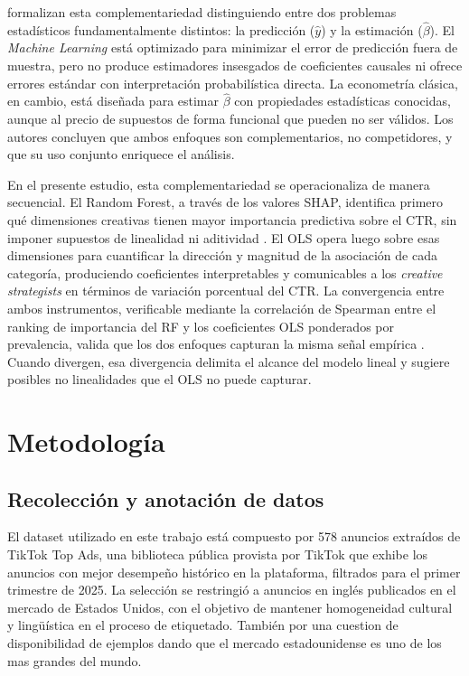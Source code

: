 \documentclass[12pt, a4paper]{report}
\begin{document}
\citet{mullainathan2017} formalizan esta complementariedad distinguiendo entre dos problemas
estadísticos fundamentalmente distintos: la predicción ($\hat{y}$) y la estimación ($\hat{\beta}$).
El \textit{Machine Learning} está optimizado para minimizar el error de predicción fuera de muestra,
pero no produce estimadores insesgados de coeficientes causales ni ofrece errores estándar con
interpretación probabilística directa. La econometría clásica, en cambio, está diseñada para
estimar $\hat{\beta}$ con propiedades estadísticas conocidas, aunque al precio de supuestos de
forma funcional que pueden no ser válidos. Los autores concluyen que ambos enfoques son
complementarios, no competidores, y que su uso conjunto enriquece el análisis.

En el presente estudio, esta complementariedad se operacionaliza de manera secuencial.
El Random Forest, a través de los valores SHAP, identifica primero qué dimensiones
creativas tienen mayor importancia predictiva sobre el CTR, sin imponer supuestos de
linealidad ni aditividad \citep{mullainathan2017}. El OLS opera luego sobre esas
dimensiones para cuantificar la dirección y magnitud de la asociación de cada categoría,
produciendo coeficientes interpretables y comunicables a los \textit{creative strategists}
en términos de variación porcentual del CTR. La convergencia entre ambos instrumentos,
verificable mediante la correlación de Spearman entre el ranking de importancia del RF
y los coeficientes OLS ponderados por prevalencia, valida que los dos enfoques capturan
la misma señal empírica \citep{breiman2001b}. Cuando divergen, esa divergencia delimita
el alcance del modelo lineal y sugiere posibles no linealidades que el OLS no puede capturar.

\chapter{Metodología}

\section{Recolección y anotación de datos}

El dataset utilizado en este trabajo está compuesto por 578 anuncios extraídos de TikTok Top Ads,
una biblioteca pública provista por TikTok que exhibe los anuncios con mejor desempeño histórico
en la plataforma, filtrados para el primer trimestre de 2025. La selección se restringió a anuncios
en inglés publicados en el mercado de Estados Unidos, con el objetivo de mantener homogeneidad
cultural y lingüística en el proceso de etiquetado. También por una cuestion de disponibilidad de ejemplos dando que el mercado
estadounidense es uno de los mas grandes del mundo. 
\end{document}
